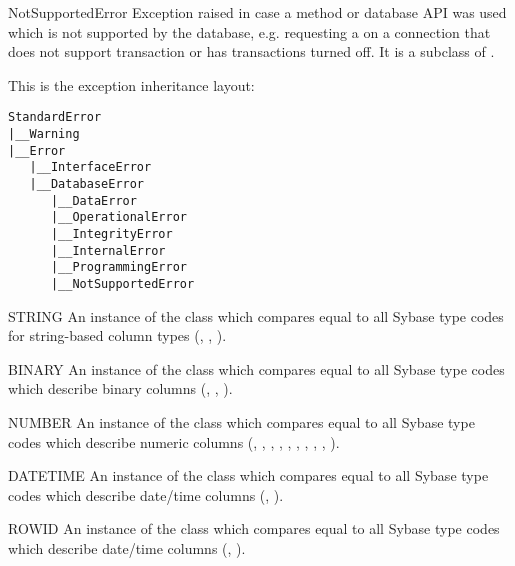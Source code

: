 \begin{excdesc}{NotSupportedError}
Exception raised in case a method or database API was used which is
not supported by the database, e.g. requesting a 
on a connection that does not support transaction or has transactions
turned off.  It is a subclass of .
\end{excdesc}

This is the exception inheritance layout:

\begin{verbatim}
StandardError
|__Warning
|__Error
   |__InterfaceError
   |__DatabaseError
      |__DataError
      |__OperationalError
      |__IntegrityError
      |__InternalError
      |__ProgrammingError
      |__NotSupportedError
\end{verbatim}

\begin{datadesc}{STRING}
An instance of the  class which compares equal
to all Sybase type codes for string-based column types (,
, ).
\end{datadesc}

\begin{datadesc}{BINARY}
An instance of the  class which compares equal
to all Sybase type codes which describe binary columns (,
, ).
\end{datadesc}

\begin{datadesc}{NUMBER}
An instance of the  class which compares equal
to all Sybase type codes which describe numeric columns (,
, , , ,
, , , ,
).
\end{datadesc}

\begin{datadesc}{DATETIME}
An instance of the  class which compares equal
to all Sybase type codes which describe date/time columns
(, ).
\end{datadesc}

\begin{datadesc}{ROWID}
An instance of the  class which compares equal
to all Sybase type codes which describe date/time columns
(, ).
\end{datadesc}

